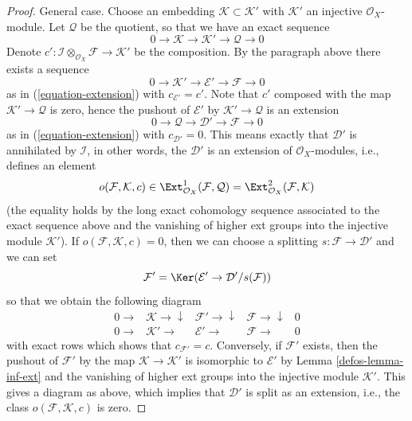 \begin{proof}
\medskip\noindent
General case. Choose an embedding $\mathcal{K} \subset \mathcal{K}'$
with $\mathcal{K}'$ an injective $\mathcal{O}_X$-module. Let $\mathcal{Q}$
be the quotient, so that we have an exact sequence
$$
0 \to \mathcal{K} \to \mathcal{K}' \to \mathcal{Q} \to 0
$$
Denote
$c' : \mathcal{I} \otimes_{\mathcal{O}_X} \mathcal{F} \to \mathcal{K}'$
be the composition. By the paragraph above there exists a sequence
$$
0 \to \mathcal{K}' \to \mathcal{E}' \to \mathcal{F} \to 0
$$
as in (\ref{equation-extension}) with $c_{\mathcal{E}'} = c'$.
Note that $c'$ composed with the map $\mathcal{K}' \to \mathcal{Q}$
is zero, hence the pushout of $\mathcal{E}'$ by
$\mathcal{K}' \to \mathcal{Q}$ is an extension
$$
0 \to \mathcal{Q} \to \mathcal{D}' \to \mathcal{F} \to 0
$$
as in (\ref{equation-extension}) with $c_{\mathcal{D}'} = 0$.
This means exactly that $\mathcal{D}'$ is annihilated by
$\mathcal{I}$, in other words, the $\mathcal{D}'$ is an extension
of $\mathcal{O}_X$-modules, i.e., defines an element
$$
o(\mathcal{F}, \mathcal{K}, c) \in
\Ext^1_{\mathcal{O}_X}(\mathcal{F}, \mathcal{Q}) =
\Ext^2_{\mathcal{O}_X}(\mathcal{F}, \mathcal{K})
$$
(the equality holds by the long exact cohomology sequence associated
to the exact sequence above and the vanishing of higher ext groups
into the injective module $\mathcal{K}'$). If
$o(\mathcal{F}, \mathcal{K}, c) = 0$, then we can choose a splitting
$s : \mathcal{F} \to \mathcal{D}'$ and we can set
$$
\mathcal{F}' = \Ker(\mathcal{E}' \to \mathcal{D}'/s(\mathcal{F}))
$$
so that we obtain the following diagram
$$
\begin{array}{ccccc}0 \longrightarrow & \mathcal{K} \longrightarrow\downarrow & \mathcal{F}' \longrightarrow\downarrow & \mathcal{F} \longrightarrow\downarrow & 0 \\ 0 \longrightarrow & \mathcal{K}' \longrightarrow & \mathcal{E}' \longrightarrow & \mathcal{F} \longrightarrow & 0\end{array}
$$
with exact rows which shows that $c_{\mathcal{F}'} = c$. Conversely, if
$\mathcal{F}'$ exists, then the pushout of $\mathcal{F}'$ by the map
$\mathcal{K} \to \mathcal{K}'$ is isomorphic to $\mathcal{E}'$ by
Lemma \ref{defos-lemma-inf-ext} and the vanishing of higher ext groups
into the injective module $\mathcal{K}'$. This gives a diagram
as above, which implies that $\mathcal{D}'$ is split as an extension, i.e.,
the class $o(\mathcal{F}, \mathcal{K}, c)$ is zero.
\end{proof}

